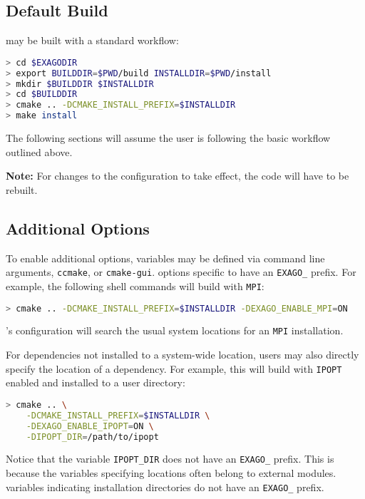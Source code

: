 \subsection{Default Build}

\exago may be built with a standard \cmake workflow:

\begin{lstlisting}[language=bash,caption={Example \cmake workflow}]
> cd $EXAGODIR
> export BUILDDIR=$PWD/build INSTALLDIR=$PWD/install
> mkdir $BUILDDIR $INSTALLDIR
> cd $BUILDDIR
> cmake .. -DCMAKE_INSTALL_PREFIX=$INSTALLDIR
> make install
\end{lstlisting}

The following sections will assume the user is following the basic workflow outlined above.

\textbf{Note:} For changes to the \cmake configuration to take effect, the code will have to be rebuilt.

\subsection{Additional Options}

To enable additional options, \cmake variables may be defined via \cmake command line arguments, \texttt{ccmake}, or \texttt{cmake-gui}.
\cmake options specific to \exago have an \texttt{EXAGO\_} prefix.
For example, the following shell commands will build \exago with \texttt{MPI}:

\begin{lstlisting}[language=bash]
> cmake .. -DCMAKE_INSTALL_PREFIX=$INSTALLDIR -DEXAGO_ENABLE_MPI=ON
\end{lstlisting}

\exago's \cmake configuration will search the usual system locations for an \texttt{MPI} installation.

For dependencies not installed to a system-wide location, users may also directly specify the location of a dependency.
For example, this will build \exago with \texttt{IPOPT} enabled and installed to a user directory:

\begin{lstlisting}[language=bash]
> cmake .. \
    -DCMAKE_INSTALL_PREFIX=$INSTALLDIR \
    -DEXAGO_ENABLE_IPOPT=ON \
    -DIPOPT_DIR=/path/to/ipopt
\end{lstlisting}

Notice that the \cmake variable \texttt{IPOPT\_DIR} does not have an \texttt{EXAGO\_} prefix.
This is because the variables specifying locations often belong to external \cmake modules.
\cmake variables indicating installation directories do not have an \texttt{EXAGO\_} prefix.

